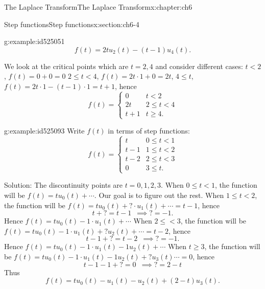 \documentclass[oneside,10pt,]{book}
\numberwithin{equation}{section}
\numberwithin{equation}{section}
\newcommand{\lt}{<}
\newcommand{\amp}{&}
\begin{document}
\begin{chapterptx}{The Laplace Transform}{}{The Laplace Transform}{}{}{x:chapter:ch6}
\begin{sectionptx}{Step functions}{}{Step functions}{}{}{x:section:ch6-4}
\begin{example}{}{g:example:id525051}
\begin{equation*}
f(t)=2tu_{2}(t)-(t-1)u_{4}(t).
\end{equation*}
%
\par
We look at the critical points which are \(t=2,4\) and consider different cases: \(t\lt2\), \(f(t)=0+0=0\) \(2\leq t\lt4\), \(f(t)=2t\cdot1+0=2t\), \(4\leq t\), \(f(t)=2t\cdot1-(t-1)\cdot1=t+1\), hence%
\begin{equation*}
f(t)=\begin{cases}
0 \amp t\lt 2\\
2t \amp 2\leq t \lt 4\\
t+1 \amp t\geq4.
\end{cases}
\end{equation*}
%
\end{example}
\begin{example}{}{g:example:id525093}%
Write \(f(t)\) in terms of step functions:%
\begin{equation*}
f(t)=\begin{cases}
t \amp 0\leq t\lt 1\\
t-1 \amp 1\leq t\lt 2\\
t-2 \amp 2\leq t\lt 3\\
0 \amp 3\leq t.
\end{cases}
\end{equation*}
%
\par
Solution: The discontinuity points are \(t=0,1,2,3\). When \(0\leq t\lt 1\), the function will be \(f(t)=tu_{0}(t)+\cdots\). Our goal is to figure out the rest. When \(1\leq t\lt 2\), the function will be \(f(t)=tu_{0}(t)+\boldsymbol{?}\cdot u_{1}(t)+\cdots=t-1\), hence%
\begin{equation*}
t+?=t-1\,\,\,\implies?=-1.
\end{equation*}
Hence \(f(t)=tu_{0}(t)-1\cdot u_{1}(t)+\cdots\) When \(2\leq \lt 3\), the function will be \(f(t)=tu_{0}(t)-1\cdot u_{1}(t)+\boldsymbol{?}u_{2}(t)+\cdots=t-2\), hence%
\begin{equation*}
t-1+?=t-2\,\,\,\implies?=-1.
\end{equation*}
Hence \(f(t)=tu_{0}(t)-1\cdot u_{1}(t)-1u_{2}(t)+\cdots\) When \(t\geq3\), the function will be \(f(t)=tu_{0}(t)-1\cdot u_{1}(t)-1u_{2}(t)+\boldsymbol{?}u_{3}(t)\cdots=0\), hence%
\begin{equation*}
t-1-1+?=0\,\,\,\implies?=2-t
\end{equation*}
Thus%
\begin{equation*}
f(t)=tu_{0}(t)-u_{1}(t)-u_{2}(t)+(2-t)u_{3}(t).
\end{equation*}

\end{example}
\end{sectionptx}
\end{chapterptx}
\end{document}
